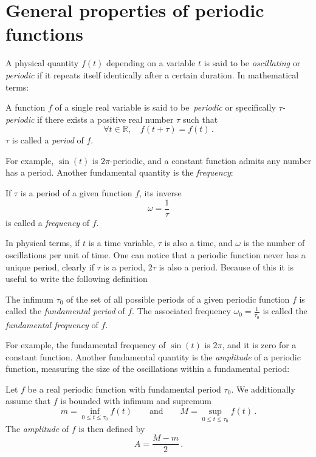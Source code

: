 \section{General properties of periodic functions}
A physical quantity $f(t)$ depending on a variable $t$ is said to be \emph{oscillating} or
\emph{periodic} if it repeats itself identically after a certain duration. In mathematical
terms:
\begin{definition}
  A function $f$ of a single real variable is said to be~\emph{periodic} or specifically
  \emph{$\tau$-periodic} if there exists a positive real number $\tau$ such that
  \begin{equation}
    \forall t\in\mathbb{R},\quad f(t+\tau)=f(t)\,.
  \end{equation}
  $\tau$ is called a \emph{period} of $f$.
\end{definition}
\noindent For example, $\sin(t)$ is $2\pi$-periodic, and a constant function admits any
number has a period. Another fundamental quantity is the \emph{frequency}:
\begin{definition}
  If $\tau$ is a period of a given function $f$, its inverse
  \begin{equation}
    \omega=\frac{1}{\tau}
  \end{equation}
  is called a \emph{frequency} of $f$.
\end{definition}
\noindent In physical terms, if $t$ is a time variable, $\tau$ is also a time, and
$\omega$ is the number of oscillations per unit of time. One can notice that a periodic
function never has a unique period, \eg clearly if $\tau$ is a period, $2\tau$ is also a
period. Because of this it is useful to write the following definition
\begin{definition}
  The infimum $\tau_0$ of the set of all possible periods of a given periodic function $f$
  is called the \emph{fundamental period} of $f$. The associated frequency
  $\omega_0=\frac{1}{\tau_0}$ is called the \emph{fundamental frequency} of $f$.
\end{definition}
\noindent For example, the fundamental frequency of $\sin(t)$ is $2\pi$, and it is zero
for a constant function. Another fundamental quantity is the \emph{amplitude} of a
periodic function, measuring the size of the oscillations within a fundamental period:
\begin{definition}
  \label{def:amplitude}
  Let $f$ be a real periodic function with fundamental period $\tau_0$. We additionally
  assume that $f$ is bounded with infimum and supremum
  \begin{equation}
    m=\inf_{0\leq t\leq \tau_0}f(t)\qquad\text{and}\qquad M=\sup_{0\leq t\leq \tau_0}f(t)\,.
  \end{equation}
  The \emph{amplitude} of $f$ is then defined by
  \begin{equation}
    A=\frac{M-m}{2}\,.
  \end{equation}
\end{definition}
